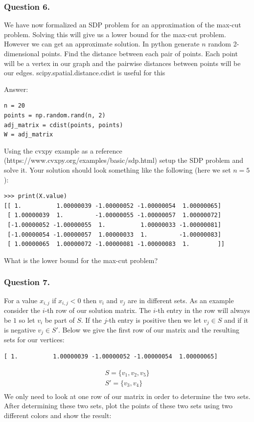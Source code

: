 \documentclass{article}
\begin{document}
\subsubsection{Question 6.}
We have now formalized an SDP problem for an approximation of the max-cut problem. Solving this will give us a lower bound for the max-cut problem. However we can get an approximate solution.
In python generate \( n \) random 2-dimensional points.
Find the distance between each pair of points. Each point will be a vertex in our graph and the pairwise distances between points will be our edges.
scipy.spatial.distance.cdist is useful for this

Answer:
\begin{verbatim}
n = 20
points = np.random.rand(n, 2)
adj_matrix = cdist(points, points)
W = adj_matrix
\end{verbatim}

Using the cvxpy example as a reference (https://www.cvxpy.org/examples/basic/sdp.html) setup the SDP problem and solve it.
Your solution should look something like the following (here we set \( n = 5 \)):

\begin{verbatim}
>>> print(X.value)
[[ 1.          1.00000039 -1.00000052 -1.00000054  1.00000065]
 [ 1.00000039  1.         -1.00000055 -1.00000057  1.00000072]
 [-1.00000052 -1.00000055  1.          1.00000033 -1.00000081]
 [-1.00000054 -1.00000057  1.00000033  1.         -1.00000083]
 [ 1.00000065  1.00000072 -1.00000081 -1.00000083  1.        ]]
\end{verbatim}

What is the lower bound for the max-cut problem?

\subsubsection{Question 7.}
For a value \( x_{i, j} \) if \( x_{i, j} < 0 \) then \( v_i \) and \( v_j \) are in different sets.
As an example consider the \( i \)-th row of our solution matrix.
The \( i \)-th entry in the row will always be \( 1 \) so let \( v_i \) be part of \( S \).
If the \( j \)-th entry is positive then we let \( v_j \in S \) and if it is negative \( v_j \in S' \).
Below we give the first row of our matrix and the resulting sets for our vertices:
\begin{verbatim}
[ 1.          1.00000039 -1.00000052 -1.00000054  1.00000065]
\end{verbatim}
\begin{gather*}
S = \{ v_1, v_2, v_5 \} \\
S' = \{ v_3, v_4 \} \\
\end{gather*}
We only need to look at one row of our matrix in order to determine the two sets.
After determining these two sets, plot the points of these two sets using two different colors and show the result:
\end{document}
